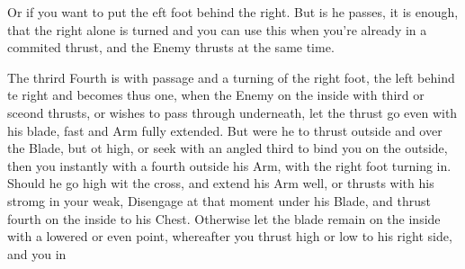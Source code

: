 \newpage


\newpage


Or if you want  to put the eft foot behind the right. But is he
passes, it is enough, that the right alone is turned and you can use
this when you're already in a commited thrust, and the Enemy thrusts
at the same time.

The thrird Fourth is with passage and a turning of the right foot, the
left behind te right and becomes thus one, when the Enemy on the
inside with third or sceond thrusts, or wishes to pass through
underneath, let the thrust go even with his blade, fast and Arm fully extended.
But were he to thrust outside and over the Blade, but ot high, or seek
with an angled third to bind you on the outside, then you instantly
with a fourth outside his Arm, with the right foot turning in. Should
he go high wit the cross, and extend his Arm well, or thrusts with his
stromg in your weak, Disengage at that moment under his Blade, and
thrust fourth on the inside to his Chest.
Otherwise let the blade remain on the inside with a lowered or even
point, whereafter you thrust high or low to his right side, and you in
